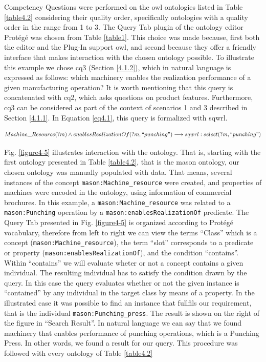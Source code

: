 Competency Questions were performed on the \gls{owl} ontologies listed in Table \ref{table4.2} considering their quality order, specifically ontologies  with a quality order in the range from 1 to 3. The Query Tab plugin of the ontology editor Protégé was chosen from Table \ref{table1}. This choice was made because, first both the editor and the Plug-In support \gls{owl}, and second because they offer a friendly interface that makes interaction with the chosen ontology possible.  To illustrate this example we chose \gls{cq}3 (Section \ref{4.1.2}), which in natural language is expressed as follows: which machinery enables the realization performance of a given manufacturing operation? It is worth  mentioning that this query is concatenated with \gls{cq}2, which asks questions on product features. Furthermore, \gls{cq}3 can be considered as part of the context of scenarios 1 and 3 described in Section \ref{4.1.1}. In Equation \ref{eq4.1}, this query is formalized with \gls{sqwrl}.

\begin{equation}\label{eq4.1}
	Machine\_Resource(?m) \wedge enablesRealizationOf(?m,``punching") \longrightarrow sqwrl:select(?m,``punching")
\end{equation}


Fig. \ref{figure4-5} illustrates interaction with the ontology. That is, starting with the first ontology presented in Table \ref{table4.2}, that is the \gls{mason} ontology, our chosen ontology was manually populated with data. That means, several instances of the concept \texttt{mason:Machine\_resource} were created, and properties of machines were encoded in the ontology, using information of commercial brochures. In this example, a \texttt{mason:Machine\_resource} was related to a  \texttt{mason:Punching} operation by  a \texttt{mason:enablesRealizationOf} predicate. The Query Tab presented in Fig. \ref{figure4-5} is organized according to Protégé vocabulary, therefore from left to right we can view the terms “Class” which is a concept (\texttt{mason:Machine\_resource}), the term “slot” corresponds to a predicate or property (\texttt{mason:enablesRealizationOf}), and the condition “contains”. Within “contains” we will evaluate wheter or not a concept contains a given individual. The resulting individual has to satisfy the condition drawn by the query. In this case the query evaluates whether or not the given instance is “contained” by any individual in the target class by means of a property. In the illustrated case it was possible to find an instance that fullfils our requirement, that is the individual \texttt{mason:Punching\_press}. The result is shown on the right of the figure in “Search Result”. In natural language we can say that we found machinery that enables performance of punching operations, which is a Punching Press. In other words, we found a result for our query. This procedure was followed with every ontology of Table \ref{table4.2}


